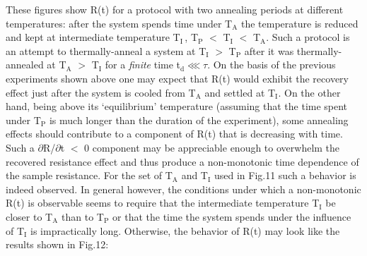 \documentclass
[preprint,showpacs,byrevtex,10pt,twocolumn,tightenlines,prl,letterpaper]{revtex4}%
\begin{document}
These figures show R(t) for a protocol with two annealing periods at different
temperatures: after the system spends time under T$_{\text{A}}$ the
temperature is reduced and kept at intermediate temperature T$_{\text{I}}\,$,
T$_{\text{P}}$%
$<$%
T$_{\text{I}}$%
$<$
T$_{\text{A}}$. Such a protocol is an attempt to thermally-anneal a system at
T$_{\text{I}}$%
$>$%
T$_{\text{P}}$ after it was thermally-annealed at T$_{\text{A}}$%
$>$%
T$_{\text{I}}$ for a \textit{finite} time t$_{\text{d}}\lll\tau$. On the basis
of the previous experiments shown above one may expect that R(t) would exhibit
the recovery effect just after the system is cooled from T$_{\text{A}}$ and
settled at T$_{\text{I}}$. On the other hand, being above its `equilibrium'
temperature (assuming that the time spent under T$_{\text{P}}$ is much longer
than the duration of the experiment), some annealing effects should contribute
to a component of R(t) that is decreasing with time. Such a $\partial
$R/$\partial$t%
$<$%
0 component may be appreciable enough to overwhelm the recovered resistance
effect and thus produce a non-monotonic time dependence of the sample
resistance. For the set of T$_{\text{A}}$ and T$_{\text{I}}$ used in Fig.11
such a behavior is indeed observed. In general however, the conditions under
which a non-monotonic R(t) is observable seems to require that the
intermediate temperature T$_{\text{I}}$ be closer to T$_{\text{A}}$ than to
T$_{\text{P}}$ or that the time the system spends under the influence of
T$_{\text{I}}$ is impractically long. Otherwise, the behavior of R(t) may look
like the results shown in Fig.12:%
\end{document}
